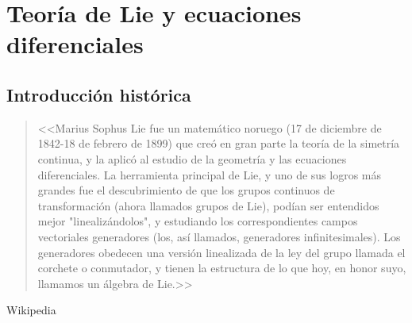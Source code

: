 \chapter{Teoría de Lie y ecuaciones diferenciales}


\section{Introducción histórica}




\begin{quote}
<<Marius Sophus Lie fue un matemático noruego (17 de diciembre de 1842-18 de febrero de 1899) que creó en gran parte la teoría de la simetría continua, y la aplicó al estudio de la geometría y las ecuaciones diferenciales.
La herramienta principal de Lie, y uno de sus logros más grandes fue el descubrimiento de que los grupos continuos de transformación (ahora llamados grupos de Lie), podían ser
 entendidos mejor "linealizándolos", y estudiando los correspondientes campos vectoriales generadores (los, así llamados, generadores infinitesimales).
Los generadores obedecen una versión linealizada de la ley del grupo llamada el corchete o conmutador, y tienen la estructura de lo que hoy, en honor suyo, llamamos un álgebra de Lie.>>
\end{quote}

\begin{flushright}
Wikipedia
\end{flushright}


